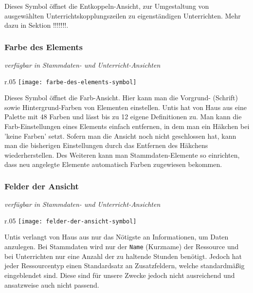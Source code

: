 \noindent
Dieses Symbol öffnet die Entkoppeln-Ansicht, zur Umgestaltung von ausgewählten Unterrichtskopplungszeilen zu eigenständigen Unterrichten. Mehr dazu in Sektion !!!!!!!.

\subsubsection{Farbe des Elements}
{\small\textit{verfügbar in Stammdaten- und Unterricht-Ansichten\\}\par}

\begin{wrapfigure}{r}{.05\textwidth}
	\vspace{-50pt}
	\texttt{[image: farbe-des-elements-symbol]}
	\vspace{-35pt}
\end{wrapfigure}

\noindent
Dieses Symbol öffnet die Farb-Ansicht. Hier kann man die Vorgrund- (Schrift) sowie Hintergrund-Farben von Elementen einstellen. Untis hat von Haus aus eine Palette mit 48 Farben und lässt bis zu 12 eigene Definitionen zu. Man kann die Farb-Einstellungen eines Elements einfach entfernen, in dem man ein Häkchen bei 'keine Farben' setzt. Sofern man die Ansicht noch nicht geschlossen hat, kann man die bisherigen Einstellungen durch das Entfernen des Häkchens wiederherstellen. Des Weiteren kann man Stammdaten-Elemente so einrichten, dass neu angelegte Elemente automatisch Farben zugewiesen bekommen.

\newpage

\subsubsection{Felder der Ansicht}
{\small\textit{verfügbar in Stammdaten- und Unterricht-Ansichten\\}\par}

\begin{wrapfigure}{r}{.05\textwidth}
	\vspace{-50pt}
	\texttt{[image: felder-der-ansicht-symbol]}
	\vspace{-35pt}
\end{wrapfigure}

\noindent
Untis verlangt von Haus aus nur das Nötigste an Informationen, um Daten anzulegen. Bei Stammdaten wird nur der \texttt{Name} (Kurzname) der Ressource und bei Unterrichten nur eine Anzahl der zu haltende Stunden benötigt. Jedoch hat jeder Ressourcentyp einen Standardsatz an Zusatzfeldern, welche standardmäßig eingeblendet sind. Diese sind für unsere Zwecke jedoch nicht ausreichend und ansatzweise auch nicht passend. 

